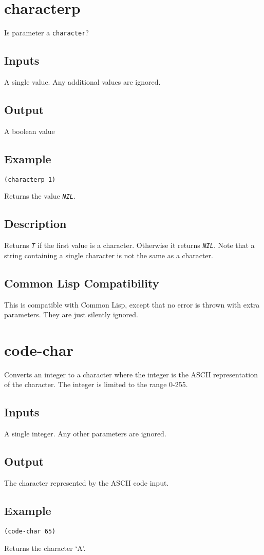 \documentclass[10pt, openany]{book}
\newcommand{\constant}[1]{\emph{\texttt{#1}}}
\newcommand{\datatype}[1]{\texttt{#1}}
\newcommand{\cl}{Common Lisp}
\begin{document}
\section{characterp}
Is parameter a \datatype{character}?
\subsection{Inputs}
A single value.  Any additional values are ignored.
\subsection{Output}
A boolean value
\subsection{Example}
\begin{lstlisting}
(characterp 1)
\end{lstlisting}
Returns the value \constant{NIL}.
\subsection{Description}
Returns \constant{T} if the first value is a character.  Otherwise it returns \constant{NIL}.  Note that a string containing a single character is not the same as a character.
\subsection{Common Lisp Compatibility}
This is compatible with \cl, except that no error is thrown with extra parameters.  They are just silently ignored.

\section{code-char}
Converts an integer to a character where the integer is the ASCII representation of the character.  The integer is limited to the range 0-255.
\subsection{Inputs}
A single integer.  Any other parameters are ignored.
\subsection{Output}
The character represented by the ASCII code input.
\subsection{Example}
\begin{lstlisting}
(code-char 65)
\end{lstlisting}
Returns the character `A'.
\end{document}

